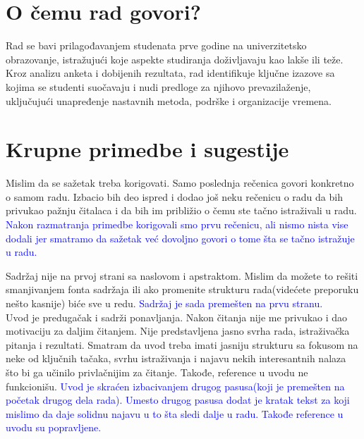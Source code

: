\documentclass[a4paper]{report}
\newcommand{\odgovor}[1]{\textcolor{blue}{#1}}
\begin{document}
\section{O čemu rad govori?}
Rad se bavi prilagođavanjem studenata prve godine na univerzitetsko obrazovanje, istražujući koje aspekte studiranja doživljavaju kao lakše ili teže. Kroz analizu anketa i dobijenih rezultata, rad identifikuje ključne izazove sa kojima se studenti suočavaju i nudi predloge za njihovo prevazilaženje, uključujući unapređenje nastavnih metoda, podrške i organizacije vremena.

\section{Krupne primedbe i sugestije}

Mislim da se sažetak treba korigovati. Samo poslednja rečenica govori konkretno o samom radu. Izbacio bih deo ispred i dodao još neku rečenicu o radu da bih privukao pažnju čitalaca i da bih im približio o čemu ste tačno istraživali u radu. \odgovor{Nakon razmatranja primedbe korigovali smo prvu rečenicu, ali nismo nista vise dodali jer smatramo da sažetak već dovoljno govori o tome šta se tačno istražuje u radu.}

Sadržaj nije na prvoj strani sa naslovom i apstraktom. Mislim da možete to rešiti smanjivanjem fonta sadržaja ili ako promenite strukturu rada(videćete preporuku nešto kasnije) biće sve u redu. \odgovor{Sadržaj je sada premešten na prvu stranu.} \\

Uvod je predugačak i sadrži ponavljanja. Nakon čitanja nije me privukao i dao motivaciju za daljim čitanjem. Nije predstavljena jasno svrha rada, istraživačka pitanja i rezultati. Smatram da uvod treba imati jasniju strukturu sa fokusom na neke od ključnih tačaka, svrhu istraživanja i najavu nekih interesantnih nalaza što bi ga učinilo privlačnijim za čitanje. Takođe, reference u uvodu ne funkcionišu. \odgovor{Uvod je skraćen izbacivanjem drugog pasusa(koji je premešten na početak drugog dela rada). Umesto drugog pasusa dodat je kratak tekst za koji mislimo da daje solidnu najavu u to šta sledi dalje u radu. Takođe reference u uvodu su popravljene.} \\
\end{document}
